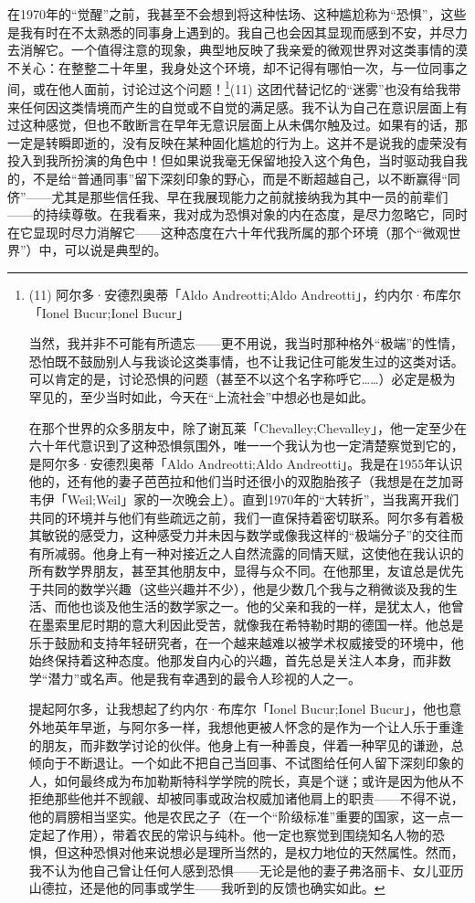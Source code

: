 在1970年的“觉醒”之前，我甚至不会想到将这种怯场、这种尴尬称为“恐惧”，这些是我有时在不太熟悉的同事身上遇到的。我自己也会因其显现而感到不安，并尽力去消解它。一个值得注意的现象，典型地反映了我亲爱的微观世界对这类事情的漠不关心：在整整二十年里，我身处这个环境，却不记得有哪怕一次，与一位同事之间，或在他人面前，讨论过这个问题！\footnote{(11) 阿尔多·安德烈奥蒂「Aldo Andreotti;Aldo Andreotti」，约内尔·布库尔「Ionel Bucur;Ionel Bucur」 \par 当然，我并非不可能有所遗忘——更不用说，我当时那种格外“极端”的性情，恐怕既不鼓励别人与我谈论这类事情，也不让我记住可能发生过的这类对话。可以肯定的是，讨论恐惧的问题（甚至不以这个名字称呼它……）必定是极为罕见的，至少当时如此，今天在“上流社会”中想必也是如此。

在那个世界的众多朋友中，除了谢瓦莱「Chevalley;Chevalley」，他一定至少在六十年代意识到了这种恐惧氛围外，唯一一个我认为也一定清楚察觉到它的，是阿尔多·安德烈奥蒂「Aldo Andreotti;Aldo Andreotti」。我是在1955年认识他的，还有他的妻子芭芭拉和他们当时还很小的双胞胎孩子（我想是在芝加哥韦伊「Weil;Weil」家的一次晚会上）。直到1970年的“大转折”，当我离开我们共同的环境并与他们有些疏远之前，我们一直保持着密切联系。阿尔多有着极其敏锐的感受力，这种感受力并未因与数学或像我这样的“极端分子”的交往而有所减弱。他身上有一种对接近之人自然流露的同情天赋，这使他在我认识的所有数学界朋友，甚至其他朋友中，显得与众不同。在他那里，友谊总是优先于共同的数学兴趣（这些兴趣并不少），他是少数几个我与之稍微谈及我的生活、而他也谈及他生活的数学家之一。他的父亲和我的一样，是犹太人，他曾在墨索里尼时期的意大利因此受苦，就像我在希特勒时期的德国一样。他总是乐于鼓励和支持年轻研究者，在一个越来越难以被学术权威接受的环境中，他始终保持着这种态度。他那发自内心的兴趣，首先总是关注人本身，而非数学“潜力”或名声。他是我有幸遇到的最令人珍视的人之一。

提起阿尔多，让我想起了约内尔·布库尔「Ionel Bucur;Ionel Bucur」，他也意外地英年早逝，与阿尔多一样，我想他更被人怀念的是作为一个让人乐于重逢的朋友，而非数学讨论的伙伴。他身上有一种善良，伴着一种罕见的谦逊，总倾向于不断退让。一个如此不把自己当回事、不试图给任何人留下深刻印象的人，如何最终成为布加勒斯特科学学院的院长，真是个谜；或许是因为他从不拒绝那些他并不觊觎、却被同事或政治权威加诸他肩上的职责——不得不说，他的肩膀相当坚实。他是农民之子（在一个“阶级标准”重要的国家，这一点一定起了作用），带着农民的常识与纯朴。他一定也察觉到围绕知名人物的恐惧，但这种恐惧对他来说想必是理所当然的，是权力地位的天然属性。然而，我不认为他自己曾让任何人感到恐惧——无论是他的妻子弗洛丽卡、女儿亚历山德拉，还是他的同事或学生——我听到的反馈也确实如此。}(11) 这团代替记忆的“迷雾”也没有给我带来任何因这类情境而产生的自觉或不自觉的满足感。我不认为自己在意识层面上有过这种感觉，但也不敢断言在早年无意识层面上从未偶尔触及过。如果有的话，那一定是转瞬即逝的，没有反映在某种固化尴尬的行为上。这并不是说我的虚荣没有投入到我所扮演的角色中！但如果说我毫无保留地投入这个角色，当时驱动我自我的，不是给“普通同事”留下深刻印象的野心，而是不断超越自己，以不断赢得“同侪”——尤其是那些信任我、早在我展现能力之前就接纳我为其中一员的前辈们——的持续尊敬。在我看来，我对成为恐惧对象的内在态度，是尽力忽略它，同时在它显现时尽力消解它——这种态度在六十年代我所属的那个环境（那个“微观世界”）中，可以说是典型的。

